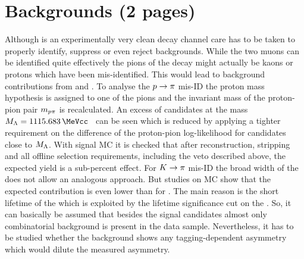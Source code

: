 
\section{Backgrounds (2 pages)}
\label{sec:bd2jpsiks:backgrounds}

Although \BdToJPsiKS is an experimentally very clean decay channel care has to
be taken to properly identify, suppress or even reject backgrounds. While the
two muons can be identified quite effectively the pions of the \KS decay might
actually be kaons or protons which have been mis-identified. This would lead
to background contributions from \BdToJPsiKst and \LbToJPsiL. To analyse the
${p} \rightarrow {\ensuremath{\pi}}$ mis-ID the proton mass hypothesis is assigned to one of
the pions and the invariant mass of the proton-pion pair $m_{{p}{\pi}}$ is
recalculated. An excess of candidates at the \Lz mass $M_{\Lz} =
\SI{1115.683}{\MeVcc}$~\cite{PDG2014} can be seen which is reduced by applying
a tighter requirement on the difference of the proton-pion log-likelihood for
candidates close to $M_{{\Lambda}}$. With \LbToJPsiL signal MC it is checked that
after reconstruction, stripping and all offline selection requirements,
including the veto described above, the expected yield is a sub-percent
effect. For ${K} \rightarrow {\ensuremath{\pi}}$ mis-ID the broad width of the \Kstarz does not
allow an analogous approach. But studies on \BdToJPsiKst MC show that the
expected contribution is even lower than for \LbToJPsiL. The main reason is
the short lifetime of the \Kstarz which is exploited by the lifetime
significance cut on the \KS. So, it can basically be assumed that besides the
signal candidates almost only combinatorial background is present in the data
sample. Nevertheless, it has to be studied whether the background shows any
tagging-dependent asymmetry which would dilute the measured \CP asymmetry.

